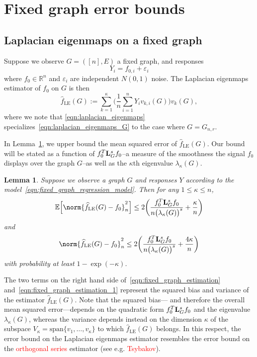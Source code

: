 \documentclass{article}
\newcommand{\Reals}{\mathbb{R}}
\newcommand{\1}{\mathbf{1}}
\newcommand{\Lap}{{\bf L}}
\newcommand{\Ebb}{\mathbb{E}}
\newcommand{\wh}[1]{\widehat{#1}}
\newcommand{\LE}{\mathrm{LE}}
\theoremstyle{alden}
\theoremstyle{aldenthm}
\newtheorem{lemma}{Lemma}
\theoremstyle{definition}
\theoremstyle{remark}
\begin{document}
\section{Fixed graph error bounds}

\subsection{Laplacian eigenmaps on a fixed graph}
Suppose we observe $G = ([n],E)$ a fixed graph, and responses
\begin{equation}
\label{eqn:fixed_graph_regression_model}
Y_i = f_{0,i} + \varepsilon_i
\end{equation}
where $f_0 \in \Reals^n$ and $\varepsilon_i$ are independent $N(0,1)$ noise. The Laplacian eigenmaps estimator of $f_0$ on $G$ is then
\begin{equation}
\label{eqn:laplacian_eigenmaps_G}
\wh{f}_{\LE}(G) := \sum_{k = 1}^{\kappa} \biggl(\frac{1}{n}\sum_{i = 1}^{n} Y_i v_{k,i}(G) \biggr) v_k(G),
\end{equation}
where we note that \eqref{eqn:laplacian_eigenmaps} specializes~\eqref{eqn:laplacian_eigenmaps_G} to the case where $G = G_{n,r}$.

In Lemma~\ref{lem:fixed_graph_estimation}, we upper bound the mean squared error of $\wh{f}_{\LE}(G)$. Our bound will be stated as a function of $f_0^T \Lap_G^s f_0$--a measure of the smoothness the signal $f_0$ displays over the graph $G$--as well as the $\kappa$th eigenvalue $\lambda_{\kappa}(G)$.

\begin{lemma}
	\label{lem:fixed_graph_estimation}
	Suppose we observe a graph $G$ and responses $Y$ according to the model~\eqref{eqn:fixed_graph_regression_model}. Then for any $1 \leq \kappa \leq n$, 
	\begin{equation}
	\label{eqn:fixed_graph_estimation}
	\Ebb\Bigl[\norm{\wh{f}_{\LE}(G) - f_0}_n^2\Bigr] \leq 2\biggl(\frac{f_0^T \Lap_{G}^s f_0}{n \bigl(\lambda_{\kappa}(G)\bigr)^s} + \frac{\kappa}{n}\biggr)
	\end{equation}
	and
	\begin{equation}
	\label{eqn:fixed_graph_estimation_1}
	\norm{\wh{f}_{\LE}(G) - f_0}_n^2 \leq 2\biggl(\frac{f_0^T \Lap_{G}^s f_0}{n \bigl(\lambda_{\kappa}(G)\bigr)^s} + \frac{4\kappa}{n}\biggr)
	\end{equation}
	with probability at least $1 - \exp(-\kappa)$.
\end{lemma}
The two terms on the right hand side of~\eqref{eqn:fixed_graph_estimation} and~\eqref{eqn:fixed_graph_estimation_1} represent the squared bias and variance of the estimator $\wh{f}_{\LE}(G)$. Note that the squared bias--- and therefore the overall mean squared error---depends on the quadratic form $f_0^T \Lap_{G}^s f_0$ and the eigenvalue $\lambda_{\kappa}(G)$, whereas the variance depends instead on the dimension $\kappa$ of the subspace $V_{\kappa} = \textrm{span}\{v_1,\ldots,v_{\kappa}\}$ to which $\wh{f}_{\LE}(G)$ belongs. In this respect, the error bound on the Laplacian eigenmaps estimator resembles the error bound on the \textcolor{red}{orthogonal series} estimator (see e.g. \textcolor{red}{Tsybakov}).
\end{document}
